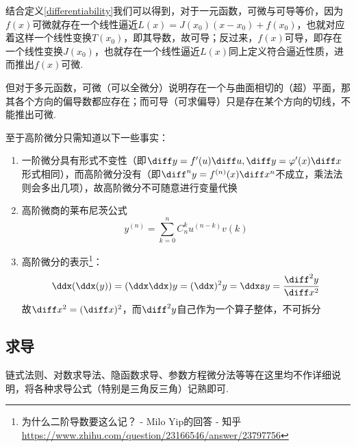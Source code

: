 \par 结合定义\ref{differentiability}我们可以得到，对于一元函数，可微与可导等价，因为$f(x)$可微就存在一个线性逼近$L(x)=J(x_0)(x-x_0)+f(x_0)$，也就对应着这样一个线性变换$T(x_0)$，即其导数，故可导；反过来，$f(x)$可导，即存在一个线性变换$J(x_0)$，也就存在一个线性逼近$L(x)$同上定义符合逼近性质，进而推出$f(x)$可微.
\par 但对于多元函数，可微（可以全微分）说明存在一个与曲面相切的（超）平面，那其各个方向的偏导数都应存在；而可导（可求偏导）只是存在某个方向的切线，不能推出可微.
\par 至于高阶微分只需知道以下一些事实：
\begin{enumerate}
	\item 一阶微分具有形式不变性（即$\diff y=f'(u)\diff u,\diff y=\varphi'(x)\diff x$形式相同），而高阶微分没有（即$\diff^ny=f^{(n)}(x)\diff x^n$不成立，乘法法则会多出几项），故高阶微分不可随意进行变量代换
	\item 高阶微商的莱布尼茨公式
	\[y^{(n)}=\sum_{k=0}^nC_n^ku^{(n-k)}v{(k)}\]
	\item 高阶微分的表示\footnote{为什么二阶导数要这么记？ - Milo Yip的回答 - 知乎 \url{https://www.zhihu.com/question/23166546/answer/23797756}}：
	\[\ddx(\ddx(y))=(\ddx\ddx)y=(\ddx)^2y=\ddxs y=\dfrac{\diff^2 y}{\diff x^2}\]
	故$\diff x^2=(\diff x)^2$，而$\diff^2 y$自己作为一个算子整体，不可拆分
\end{enumerate}

\subsection{求导}
链式法则、对数求导法、隐函数求导、参数方程微分法等等在这里均不作详细说明，将各种求导公式（特别是三角反三角）记熟即可.

